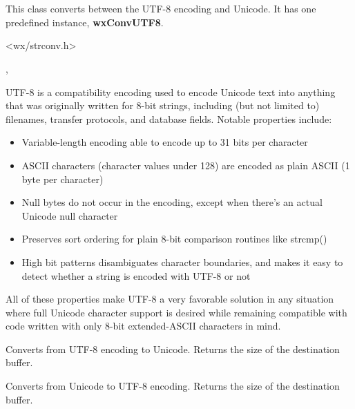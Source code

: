%
%

\section{}\label{wxmbconvutf8}

This class converts between the UTF-8 encoding and Unicode.
It has one predefined instance, {\bf wxConvUTF8}.




<wx/strconv.h>


, 


UTF-8 is a compatibility encoding used to encode Unicode text into anything that was
originally written for 8-bit strings, including (but not limited to) filenames, transfer
protocols, and database fields. Notable properties include:

\begin{itemize}
\item Variable-length encoding able to encode up to 31 bits per character
\item ASCII characters (character values under 128) are encoded as plain ASCII
(1 byte per character)
\item Null bytes do not occur in the encoding, except when there's an actual Unicode
null character
\item Preserves sort ordering for plain 8-bit comparison routines like strcmp()
\item High bit patterns disambiguates character boundaries, and makes it easy to
detect whether a string is encoded with UTF-8 or not
\end{itemize}

All of these properties make UTF-8 a very favorable solution in any situation
where full Unicode character support is desired while remaining compatible with
code written with only 8-bit extended-ASCII characters in mind.



\label{wxmbconvutf8mb2wc}


Converts from UTF-8 encoding to Unicode. Returns the size of the destination buffer.

\label{wxmbconvutf8wc2mb}


Converts from Unicode to UTF-8 encoding. Returns the size of the destination buffer.

